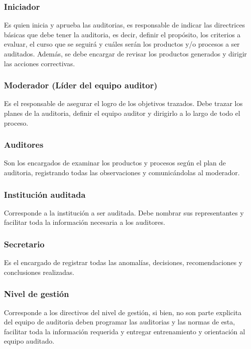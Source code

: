 \subsubsection{Iniciador}

Es quien inicia y aprueba las auditorias, es responsable de indicar las directrices básicas que debe tener la auditoria, es decir, definir el propósito, los criterios a evaluar, el curso que se seguirá y cuáles serán los productos y/o procesos a ser auditados. Además, se debe encargar de revisar los productos generados y dirigir las acciones correctivas.

\subsubsection{Moderador (Líder del equipo auditor)}

Es el responsable de asegurar el logro de los objetivos trazados. Debe trazar los planes de la auditoria, definir el equipo auditor y dirigirlo a lo largo de todo el proceso. 

\subsubsection{Auditores}

Son los encargados de examinar los productos y procesos según el plan de auditoria, registrando todas las observaciones y comunicándolas al moderador.

\subsubsection{Institución auditada}

Corresponde a la institución a ser auditada. Debe nombrar sus representantes y facilitar toda la información necesaria a los auditores.

\subsubsection{Secretario}

Es el encargado de registrar todas las anomalías, decisiones, recomendaciones y conclusiones realizadas.

\subsubsection{Nivel de gestión}

Corresponde a los directivos del nivel de gestión, si bien, no son parte explicita del equipo de auditoria deben programar las auditorias y las normas de esta, facilitar toda la información requerida y entregar entrenamiento y orientación al equipo auditado. 

